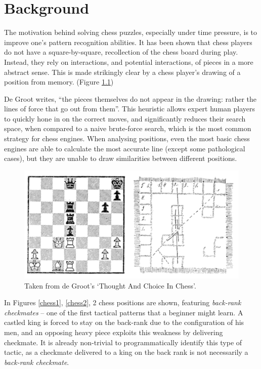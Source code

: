 \chapter{Background}

The motivation behind solving chess puzzles, especially under time pressure, is
to improve one's pattern recognition abilities. It has been shown
\cite{thoughtAndChoice} that chess players do not have a square-by-square,
recollection of the chess board during play. Instead, they rely on
interactions, and potential interactions, of pieces in a more abstract sense.
This is made strikingly clear by a chess player's drawing of a position from
memory. (Figure \ref{deGrootFigure})

De Groot writes, ``the pieces themselves do not appear in the drawing: rather
the lines of force that go out from them''. This heuristic allows expert human
players to quickly hone in on the correct moves,\cite{bilalic2010mechanisms}
and significantly reduces their search space, when compared to a naive
brute-force search, which is the most common strategy for chess engines. When
analysing positions, even the most basic chess engines are able to calculate
the most accurate line (except some pathological cases), but they are unable to
draw similarities between different positions.

\begin{figure}[H]
    \centering
    \includegraphics[width=0.9\linewidth]{background/img/deGroot.png}
    \caption{Taken from de Groot's `Thought And Choice In Chess'.\cite{thoughtAndChoice}}
    \label{deGrootFigure}
\end{figure}

In Figures \ref{chess1}, \ref{chess2}, 2 chess positions are shown, featuring
\emph{back-rank checkmates} -- one of the first tactical patterns that a
beginner might learn. A castled king is forced to stay on the back-rank due to
the configuration of his men, and an opposing heavy piece exploits this
weakness by delivering checkmate. It is already non-trivial to programmatically
identify this type of tactic, as a checkmate delivered to a king on the back
rank is not necessarily a \emph{back-rank checkmate}.

